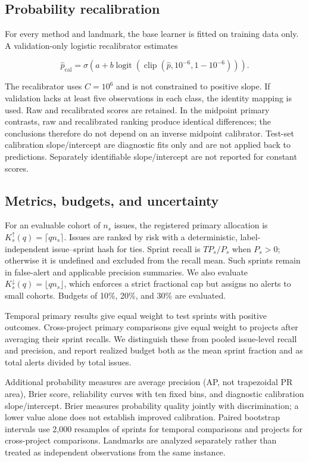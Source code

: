 \documentclass[11pt,a4paper]{article}
\begin{document}
\subsection{Probability recalibration}\label{probability-recalibration}

For every method and landmark, the base learner is fitted on training data only. A validation-only logistic recalibrator estimates

\[
\widehat p_{\mathrm{cal}}=\sigma\!\left(a+b\operatorname{logit}(\operatorname{clip}(\widehat p,10^{-6},1-10^{-6}))\right).
\]

The recalibrator uses \(C=10^6\) and is not constrained to positive slope. If validation lacks at least five observations in each class, the identity mapping is used. Raw and recalibrated scores are retained. In the midpoint primary contrasts, raw and recalibrated ranking produce identical differences; the conclusions therefore do not depend on an inverse midpoint calibrator. Test-set calibration slope/intercept are diagnostic fits only and are not applied back to predictions. Separately identifiable slope/intercept are not reported for constant scores.

\subsection{Metrics, budgets, and uncertainty}\label{metrics-budgets-and-uncertainty}

For an evaluable cohort of \(n_s\) issues, the registered primary allocation is \(K_s^{\uparrow}(q)=\lceil qn_s\rceil\). Issues are ranked by risk with a deterministic, label-independent issue--sprint hash for ties. Sprint recall is \(TP_s/P_s\) when \(P_s>0\); otherwise it is undefined and excluded from the recall mean. Such sprints remain in false-alert and applicable precision summaries. We also evaluate \(K_s^{\downarrow}(q)=\lfloor qn_s\rfloor\), which enforces a strict fractional cap but assigns no alerts to small cohorts. Budgets of 10\%, 20\%, and 30\% are evaluated.

Temporal primary results give equal weight to test sprints with positive outcomes. Cross-project primary comparisons give equal weight to projects after averaging their sprint recalls. We distinguish these from pooled issue-level recall and precision, and report realized budget both as the mean sprint fraction and as total alerts divided by total issues.

Additional probability measures are average precision (AP, not trapezoidal PR area), Brier score, reliability curves with ten fixed bins, and diagnostic calibration slope/intercept. Brier measures probability quality jointly with discrimination; a lower value alone does not establish improved calibration. Paired bootstrap intervals use 2,000 resamples of sprints for temporal comparisons and projects for cross-project comparisons. Landmarks are analyzed separately rather than treated as independent observations from the same instance.
\end{document}
